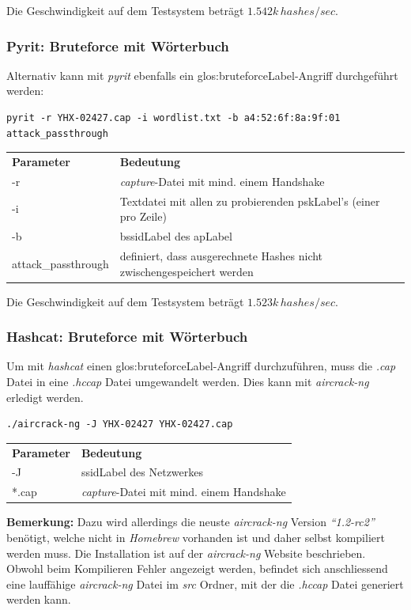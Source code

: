 Die Geschwindigkeit auf dem Testsystem beträgt $1.542k\,hashes/sec$.

\subsubsection{Pyrit: Bruteforce mit Wörterbuch}
Alternativ kann mit \textit{pyrit} ebenfalls ein \gls{glos:bruteforceLabel}-Angriff durchgeführt werden:
\begin{lstlisting}[style=lstStyleFramed]
pyrit -r YHX-02427.cap -i wordlist.txt -b a4:52:6f:8a:9f:01 attack_passthrough
\end{lstlisting}
\begin{tabular}{l l}
	\textbf{Parameter} & \textbf{Bedeutung}\\
	-r & \textit{capture}-Datei mit mind. einem Handshake\\
	-i	& Textdatei mit allen zu probierenden \gls{pskLabel}'s (einer pro Zeile)\\
	-b	& \gls{bssidLabel} des \gls{apLabel}\\
	attack\_passthrough & definiert, dass ausgerechnete Hashes nicht zwischengespeichert werden\\
\end{tabular}

Die Geschwindigkeit auf dem Testsystem beträgt $1.523k\,hashes/sec$.

\subsubsection{Hashcat: Bruteforce mit Wörterbuch}
Um mit \textit{hashcat} einen \gls{glos:bruteforceLabel}-Angriff durchzuführen, muss die \textit{.cap} Datei in eine \textit{.hccap} Datei umgewandelt werden. Dies kann mit \textit{aircrack-ng} erledigt werden.

\begin{lstlisting}[style=lstStyleFramed]
./aircrack-ng -J YHX-02427 YHX-02427.cap
\end{lstlisting}
\begin{tabular}{l l}
	\textbf{Parameter} & \textbf{Bedeutung}\\
	-J & \gls{ssidLabel} des Netzwerkes\\
	*.cap & \textit{capture}-Datei mit mind. einem Handshake\\
\end{tabular}

\begin{framed}
	\textbf{Bemerkung:} Dazu wird allerdings die neuste \textit{aircrack-ng} Version \textit{"`1.2-rc2"'} benötigt, welche nicht in \textit{Homebrew} vorhanden ist und daher selbst kompiliert werden muss. Die Installation ist auf der \textit{aircrack-ng} Website beschrieben.\\
	Obwohl beim Kompilieren Fehler angezeigt werden, befindet sich anschliessend eine lauffähige \textit{aircrack-ng} Datei im \textit{src} Ordner, mit der die \textit{.hccap} Datei generiert werden kann.
\end{framed}

